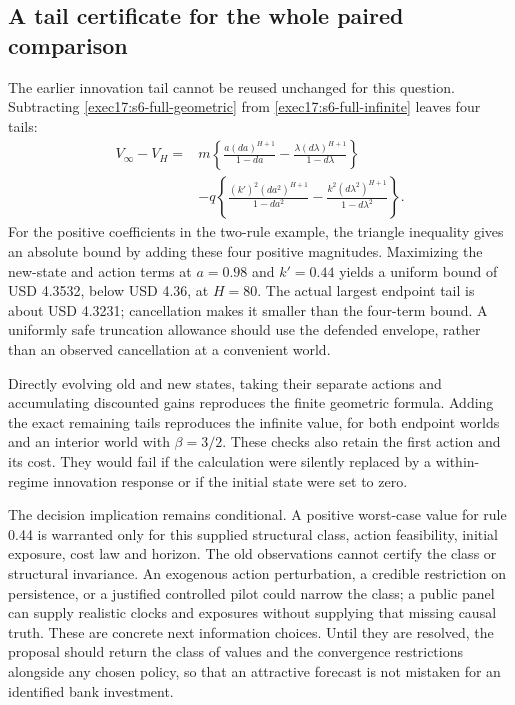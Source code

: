 \subsection{A tail certificate for the whole paired comparison}

The earlier innovation tail cannot be reused unchanged for this question.
Subtracting \eqref{exec17:s6-full-geometric} from
\eqref{exec17:s6-full-infinite} leaves four tails:
\begin{equation}
 \begin{split}
 V_\infty-V_H={}&m\left\{
 \frac{a(da)^{H+1}}{1-da}
 -\frac{\lambda(d\lambda)^{H+1}}{1-d\lambda}\right\}\\
 &-q\left\{\frac{(k')^2(da^2)^{H+1}}{1-da^2}
 -\frac{k^2(d\lambda^2)^{H+1}}{1-d\lambda^2}\right\}.
 \end{split}
 \label{exec17:s6-full-tail}
\end{equation}
For the positive coefficients in the two-rule example, the triangle
inequality gives an absolute bound by adding these four positive
magnitudes. Maximizing the new-state and action terms at $a=0.98$ and
$k'=0.44$ yields a uniform bound of USD 4.3532, below USD 4.36, at $H=80$.
The actual largest endpoint tail is about USD 4.3231; cancellation makes
it smaller than the four-term bound. A uniformly safe truncation allowance
should use the defended envelope, rather than an observed cancellation
at a convenient world.~\citep{exec17_s6_extension}

Directly evolving old and new states, taking their separate actions and
accumulating discounted gains reproduces the finite geometric formula.
Adding the exact remaining tails reproduces the infinite value, for both
endpoint worlds and an interior world with $\beta=3/2$. These checks also
retain the first action and its cost. They would fail if the calculation
were silently replaced by a within-regime innovation response or if the
initial state were set to zero.

The decision implication remains conditional. A positive worst-case value
for rule 0.44 is warranted only for this supplied structural class, action
feasibility, initial exposure, cost law and horizon. The old observations
cannot certify the class or structural invariance. An exogenous action
perturbation, a credible restriction on persistence, or a justified
controlled pilot could narrow the class; a public panel can supply
realistic clocks and exposures without supplying that missing causal
truth. These are concrete next information choices. Until they are
resolved, the proposal should return the class of values and the
convergence restrictions alongside any chosen policy, so that an
attractive forecast is not mistaken for an identified bank investment.



